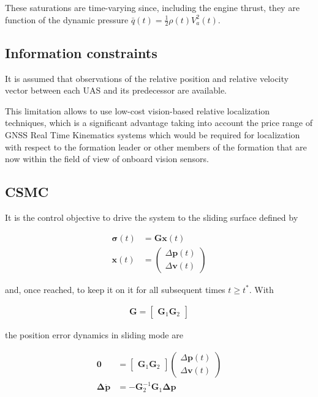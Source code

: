 \documentclass{ifacconf}
\providecommand{\mbf}[1]{\mathbf{#1}}
\begin{document}
These saturations are time-varying since, including the engine thrust, they are function of the dynamic pressure $\bar{q}(t) = \frac{1}{2}\rho(t) V_a^2(t)$.

\subsection{Information constraints}
It is assumed that observations of the relative position and relative velocity vector between each UAS and its predecessor are available.

This limitation allows to use low-cost vision-based relative localization techniques, which is a significant advantage taking into account the price range of GNSS Real Time Kinematics systems which would be required for localization with respect to the formation leader or other members of the formation that are now within the field of view of onboard vision sensors.

\subsection{CSMC}

It is the control objective to drive the system to the sliding surface defined by

\begin{align}
\mbf{\sigma}(t) &= \mbf{G}\mbf{x}(t)
\label{eq:defsigmaconti-} \\
\mbf{x}(t) &=
\begin{pmatrix}
\Delta \mbf{p}(t)\\
\Delta \mbf{v}(t)
\end{pmatrix}
\end{align}

and, once reached, to keep it on it for all subsequent times $t \geq t^*$. With

\begin{align}
\mbf{G} =
\begin{bmatrix}
\mbf{G}_1 \mbf{G}_2
\end{bmatrix}
\end{align}

the position error dynamics in sliding mode are

\begin{align}
\mbf{0}
&=
\begin{bmatrix}
\mbf{G}_1 \mbf{G}_2
\end{bmatrix}
\begin{pmatrix}
\Delta \mbf{p}(t)\\
\Delta \mbf{v}(t)
\end{pmatrix} \\
\mbf{\Delta} \dot{\mbf{p}}
&= - \mbf{G}_2^{-1} \mbf{G}_1 \mbf{\Delta} \mbf{p}
\label{eq:pdynwhilesliding}
\end{align}
\end{document}
